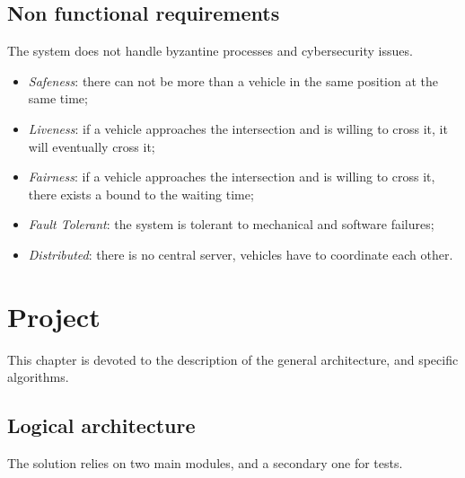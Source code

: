 \documentclass{memoir}
\begin{document}
\section{Non functional requirements}
The system does not handle byzantine processes and cybersecurity issues.

\begin{itemize}
	\item \emph{Safeness}: there can not be more than a vehicle in the same position at the same time;
	\item \emph{Liveness}: if a vehicle approaches the intersection and is willing to cross it, it will eventually cross it;
	\item \emph{Fairness}: if a vehicle approaches the intersection and is willing to cross it, there exists a bound to the waiting time;
	\item \emph{Fault Tolerant}: the system is tolerant to mechanical and software failures;
	\item \emph{Distributed}: there is no central server, vehicles have to coordinate each other.
\end{itemize}



\chapter{Project}\label{ch:project}
This chapter is devoted to the description of the general architecture, and specific algorithms.

\section{Logical architecture}
The solution relies on two main modules, and a secondary one for tests.
\end{document}
